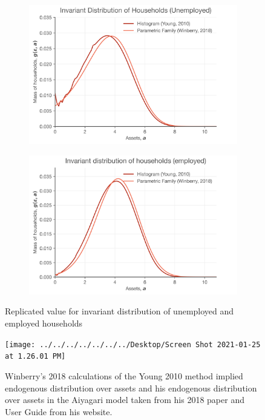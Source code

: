 \documentclass[11pt]{article}
\begin{document}
\begin{figure}[htp]
\begin{subfigure}{.5\textwidth}
\centering
\includegraphics[scale=.45]{../Figures/ivar_dist_unemployed.png}
\end{subfigure}
\begin{subfigure}{.5\textwidth}
\centering
\includegraphics[scale=.45]{../Figures/ivar_dist_employed.png}
\end{subfigure}
\caption{Replicated value for invariant distribution of unemployed and employed households}
\label{dist_rep}
 \vspace*{\floatsep}
\centering
\texttt{[image: ../../../../../../../Desktop/Screen Shot 2021-01-25 at 1.26.01 PM]}
\caption{Winberry's 2018 calculations of the Young 2010 method implied endogenous distribution over assets and his endogenous distribution over assets in the Aiyagari model taken from his 2018 paper and User Guide from his website.}
\label{dist_orig}
\end{figure}	
\end{document}
